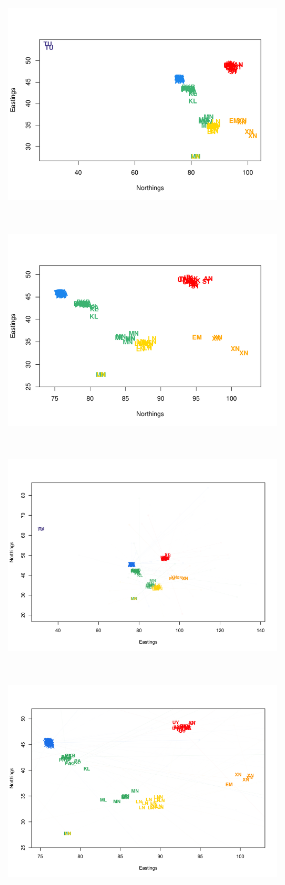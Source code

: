 \documentclass[12pt]{article}
\begin{document}
\begin{figure}
	\centering
			{\includegraphics[width=2.8in,height=2.3in]{figs/warblers/warb_ind_noad.pdf}}
			{\includegraphics[width=2.8in,height=2.3in]{figs/warblers/warb_ind_noad_closeup.pdf}}
			{\includegraphics[width=2.8in,height=2.3in]{figs/warblers/individual_warbler_map_arrows_randpr1.png}}
			{\includegraphics[width=2.8in,height=2.3in]{figs/warblers/individual_warbler_map_arrows_randpr1_closeup.png}}

\end{figure}
\end{document}
